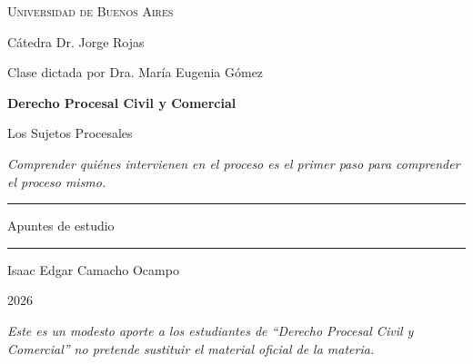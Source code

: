 \documentclass[12pt,oneside]{book}
\newcommand{\universidad}{Universidad de Buenos Aires}
\newcommand{\catedra}{Cátedra Dr. Jorge Rojas}
\newcommand{\docenteclase}{Dra. María Eugenia Gómez}
\newcommand{\materia}{Derecho Procesal Civil y Comercial}
\newcommand{\titulo}{Los Sujetos Procesales}
\newcommand{\autor}{Isaac Edgar Camacho Ocampo}
\newcommand{\anio}{2026}
\begin{document}
\begin{titlepage}
\thispagestyle{empty}

\begin{center}

\vspace*{1cm}

{\large \textsc{\universidad}}

\vspace{0.6cm}

{\normalsize \catedra}

\vspace{0.2cm}

{\normalsize Clase dictada por \docenteclase}

\vspace{2.5cm}

{\Huge \textbf{\materia}}

\vspace{1cm}

{\LARGE \titulo}

\vspace{0.9cm}

\textit{Comprender quiénes intervienen en el proceso es el primer paso para comprender el proceso mismo.}

\vspace{1.2cm}

\rule{0.70\textwidth}{0.5pt}

\vspace{0.5cm}

{\large Apuntes de estudio}

\vspace{0.5cm}

\rule{0.70\textwidth}{0.5pt}

\vfill

{\large \autor}

\vspace{0.3cm}

{\large \anio}

\end{center}

\vfill

\begin{flushleft}
\textit{Este es un modesto aporte a los estudiantes de ``Derecho Procesal Civil y Comercial'' no pretende sustituir el material oficial de la materia.}
\end{flushleft}

\end{titlepage}
\end{document}

